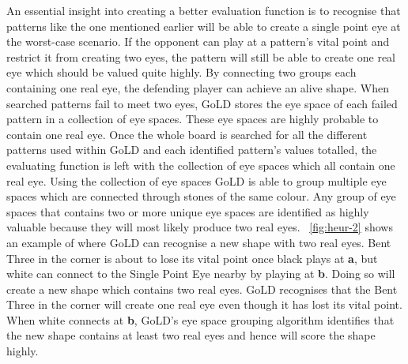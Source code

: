 \documentclass{l4proj}
\newcommand{\bo}[1]{\textbf{#1}}
\begin{document}
An essential insight into creating a better evaluation function is to recognise that patterns like the one mentioned earlier will be able to create a single point eye at the worst-case scenario. If the opponent can play at a pattern's vital point and restrict it from creating two eyes, the pattern will still be able to create one real eye which should be valued quite highly. By connecting two groups each containing one real eye, the defending player can achieve an alive shape. When searched patterns fail to meet two eyes, GoLD stores the eye space of each failed pattern in a collection of eye spaces. These eye spaces are highly probable to contain one real eye. Once the whole board is searched for all the different patterns used within GoLD and each identified pattern's values totalled, the evaluating function is left with the collection of eye spaces which all contain one real eye. Using the collection of eye spaces GoLD is able to group multiple eye spaces which are connected through stones of the same colour. Any group of eye spaces that contains two or more unique eye spaces are identified as highly valuable because they will most likely produce two real eyes.
~\autoref{fig:heur-2} shows an example of where GoLD can recognise a new shape with two real eyes. Bent Three in the corner is about to lose its vital point once black plays at \bo{a}, but white can connect to the Single Point Eye nearby by playing at \bo{b}. Doing so will create a new shape which contains two real eyes. GoLD recognises that the Bent Three in the corner will create one real eye even though it has lost its vital point. When white connects at \bo{b}, GoLD's eye space grouping algorithm identifies that the new shape contains at least two real eyes and hence will score the shape highly.
\end{document}
